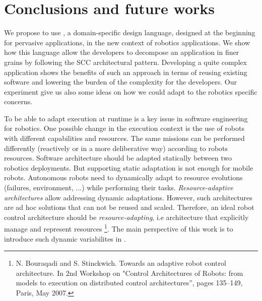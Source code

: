 
\section{Conclusions and future works}
\label{sec:conclusion}

We propose to use \diaspec{}, a domain-specific design language, designed at the beginning for pervasive applications, in the new context of robotics applications. We show how this language allow the developers to decompose an application in finer grains by following the SCC architectural pattern.
Developing a quite complex application shows the benefits of such an approach in terms of reusing existing software and lowering the burden of the complexity for the developers. Our experiment give us also some ideas on how we could adapt \diaspec{} to the robotics specific concerns.

To be able to adapt execution at runtime is a key issue in software engineering for robotics. One possible change in the execution context is the use of robots with different capabilities and resources. The same missions can be performed differently (reactively or in a more deliberative way) according to robots resources. Software architecture should be adapted statically between two robotics deployments.
But supporting static adaptation is not enough for mobile robots. Autonomous robots need to dynamically adapt to resource evolutions (failures, environment, ...) while performing their tasks. \emph{Resource-adaptive architectures} allow addressing dynamic adaptations. However, such architectures are ad hoc solutions that can not be reused and scaled. Therefore, an ideal robot control architecture should be \emph{resource-adapting}, i.e architecture that explicitly manage and represent resources \footnote{N. Bouraqadi and S. Stinckwich. Towards an adaptive robot control architecture. In 2nd Workshop on "Control Architectures of Robots: from models to execution on distributed control architectures”, pages 135–149, Paris, May 2007.}. The main perspective of this work is to introduce such dynamic variabilites in \diaspec{}.